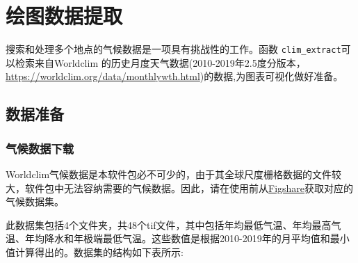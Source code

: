\documentclass[
]{ctexart}
\begin{document}
\hypertarget{ux7ed8ux56feux6570ux636eux63d0ux53d6}{%
\section{绘图数据提取}\label{ux7ed8ux56feux6570ux636eux63d0ux53d6}}

搜索和处理多个地点的气候数据是一项具有挑战性的工作。函数
\texttt{clim\_extract}可以检索来自Worldclim
的历史月度天气数据(2010-2019年2.5度分版本，\url{https://worldclim.org/data/monthlywth.html})的数据,为图表可视化做好准备。

\hypertarget{ux6570ux636eux51c6ux5907}{%
\subsection{数据准备}\label{ux6570ux636eux51c6ux5907}}

\hypertarget{ux6c14ux5019ux6570ux636eux4e0bux8f7d}{%
\subsubsection{气候数据下载}\label{ux6c14ux5019ux6570ux636eux4e0bux8f7d}}

Worldclim气候数据是本软件包必不可少的，由于其全球尺度栅格数据的文件较大，软件包中无法容纳需要的气候数据。因此，请在使用前从\href{NULL}{Figshare}获取对应的气候数据集。

此数据集包括4个文件夹，共48个tif文件，其中包括年均最低气温、年均最高气温、年均降水和年极端最低气温。这些数值是根据2010-2019年的月平均值和最小值计算得出的。数据集的结构如下表所示:
\end{document}
